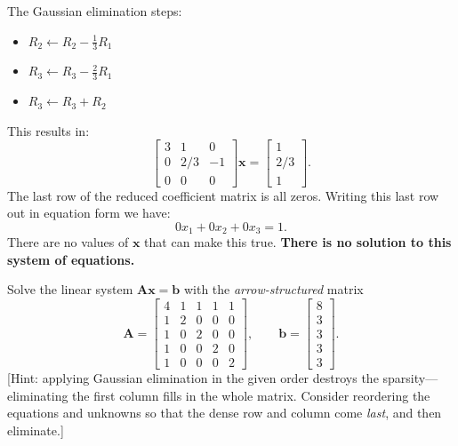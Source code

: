 \begin{solution}
    The Gaussian elimination steps:
    \begin{itemize}
        \item $R_2 \leftarrow R_2 - \tfrac{1}{3}R_1$
        \item $R_3 \leftarrow R_3 - \tfrac{2}{3}R_1$
        \item $R_3 \leftarrow R_3 + R_2$
    \end{itemize}

    This results in:
    \[
        \begin{bmatrix}
            3 & 1 & 0 \\
            0 & 2/3 & -1\\
            0 & 0 & 0
        \end{bmatrix}
        \mathbf{x}
        = \begin{bmatrix}
            1 \\ 2/3 \\ 1
        \end{bmatrix}.
    \]
    The last row of the reduced coefficient matrix is all zeros. Writing this last row out in equation form we have:
    \[
        0 x_1+ 0 x_2 + 0 x_3 = 1.
    \]
    There are no values of $\mathbf{x}$ that can make this true. \textbf{There is no solution to this system of equations.}
\end{solution}

\begin{exercise} %
    Solve the linear system $\mathbf{A}\mathbf{x} = \mathbf{b}$ with the \emph{arrow-structured} matrix
    \begin{equation*}
        \mathbf{A} =
        \begin{bmatrix}
            4 & 1 & 1 & 1 & 1 \\
            1 & 2 & 0 & 0 & 0 \\
            1 & 0 & 2 & 0 & 0 \\
            1 & 0 & 0 & 2 & 0 \\
            1 & 0 & 0 & 0 & 2
        \end{bmatrix},
        \qquad
        \mathbf{b} =
        \begin{bmatrix}
            8 \\ 3 \\ 3 \\ 3 \\ 3
        \end{bmatrix}.
    \end{equation*}
    [Hint: applying Gaussian elimination in the given order destroys the sparsity---eliminating the first column fills in the whole matrix. Consider reordering the equations and unknowns so that the dense row and column come \emph{last}, and then eliminate.]
\end{exercise}

